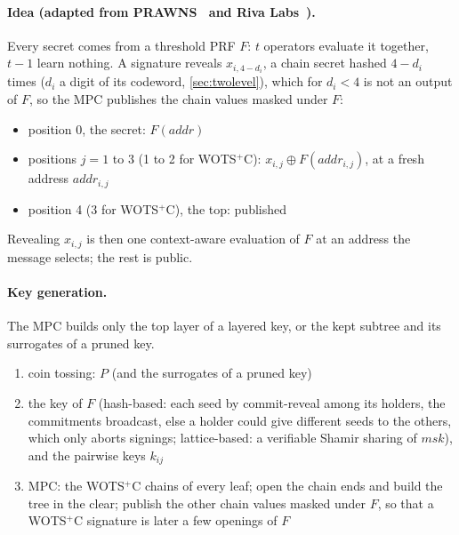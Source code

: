 \documentclass[11pt]{article}
\begin{document}
\paragraph{Idea (adapted from PRAWNS~\cite{PRAWNS} and Riva Labs~\cite{riva}).} Every secret comes from a threshold
PRF $F$: $t$ operators evaluate it together, $t-1$ learn nothing. A signature reveals $x_{i,4-d_i}$, a chain secret
hashed $4-d_i$ times ($d_i$ a digit of its codeword, \cref{sec:twolevel}), which for $d_i<4$ is not an output of $F$, so the MPC publishes the chain values masked under $F$:
\begin{itemize}
  \item position 0, the secret: $F(\mathit{addr})$
  \item positions $j = 1$ to 3 (1 to 2 for WOTS$^+$C): $x_{i,j} \oplus F(\mathit{addr}_{i,j})$, at a fresh address
        $\mathit{addr}_{i,j}$
  \item position 4 (3 for WOTS$^+$C), the top: published
\end{itemize}
Revealing $x_{i,j}$ is then one context-aware evaluation of $F$ at an address the message selects; the rest is public.

\paragraph{Key generation.} The MPC builds only the top layer of a layered key, or the kept subtree and its
surrogates of a pruned key.
\begin{enumerate}
  \item coin tossing: $P$ (and the surrogates of a pruned key)
  \item the key of $F$ (hash-based: each seed by commit-reveal among its holders, the commitments broadcast, else a
        holder could give different seeds to the others, which only aborts signings; lattice-based: a verifiable
        Shamir sharing of $\mathit{msk}$), and the pairwise keys $k_{ij}$
  \item MPC: the WOTS$^+$C chains of every leaf; open the chain ends and build the tree in the clear; publish the
        other chain values masked under $F$, so that a WOTS$^+$C signature is later a few openings of $F$
\end{enumerate}
\end{document}
